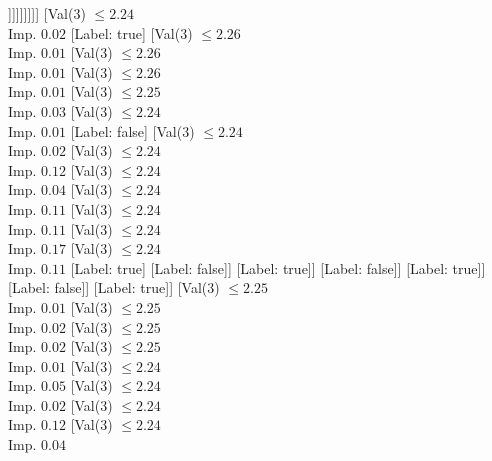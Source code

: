 \documentclass[margin=10pt]{standalone}
\begin{document}
\begin{forest}
																					[Label: false]
																					[Val($3$) $ \leq 2.23$ \\ Imp. $0.32$
																						[Label: true]
																						[Label: false]]]]]]]]]
														[Val($3$) $ \leq 2.24$ \\ Imp. $0.02$
															[Label: true]
															[Val($3$) $ \leq 2.26$ \\ Imp. $0.01$
																[Val($3$) $ \leq 2.26$ \\ Imp. $0.01$
																	[Val($3$) $ \leq 2.26$ \\ Imp. $0.01$
																		[Val($3$) $ \leq 2.25$ \\ Imp. $0.03$
																			[Val($3$) $ \leq 2.24$ \\ Imp. $0.01$
																				[Label: false]
																				[Val($3$) $ \leq 2.24$ \\ Imp. $0.02$
																					[Val($3$) $ \leq 2.24$ \\ Imp. $0.12$
																						[Val($3$) $ \leq 2.24$ \\ Imp. $0.04$
																							[Val($3$) $ \leq 2.24$ \\ Imp. $0.11$
																								[Val($3$) $ \leq 2.24$ \\ Imp. $0.11$
																									[Val($3$) $ \leq 2.24$ \\ Imp. $0.17$
																										[Val($3$) $ \leq 2.24$ \\ Imp. $0.11$
																											[Label: true]
																											[Label: false]]
																										[Label: true]]
																									[Label: false]]
																								[Label: true]]
																							[Label: false]]
																						[Label: true]]
																					[Val($3$) $ \leq 2.25$ \\ Imp. $0.01$
																						[Val($3$) $ \leq 2.25$ \\ Imp. $0.02$
																							[Val($3$) $ \leq 2.25$ \\ Imp. $0.02$
																								[Val($3$) $ \leq 2.25$ \\ Imp. $0.01$
																									[Val($3$) $ \leq 2.24$ \\ Imp. $0.05$
																										[Val($3$) $ \leq 2.24$ \\ Imp. $0.02$
																											[Val($3$) $ \leq 2.24$ \\ Imp. $0.12$
																												[Val($3$) $ \leq 2.24$ \\ Imp. $0.04$

\end{forest}
\end{document}
